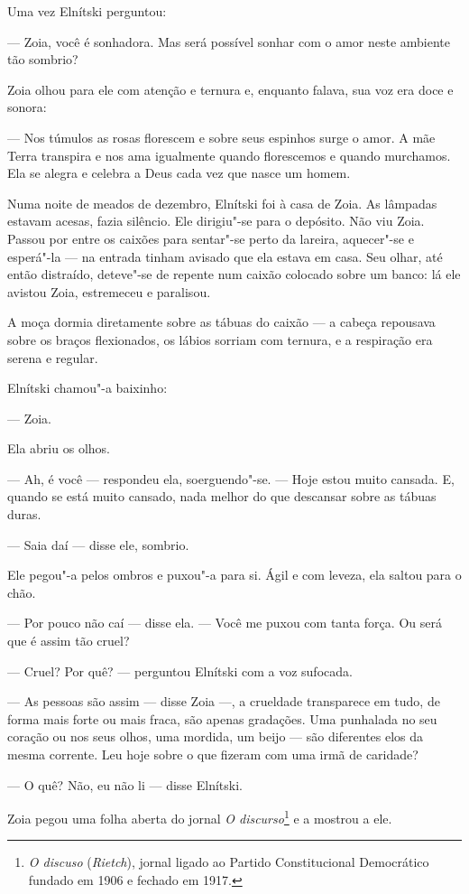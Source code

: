 Uma vez Elnítski perguntou:

--- Zoia, você é sonhadora. Mas será possível sonhar com o amor neste
ambiente tão sombrio?

Zoia olhou para ele com atenção e ternura e, enquanto falava, sua voz
era doce e sonora:

--- Nos túmulos as rosas florescem e sobre seus espinhos surge o amor. A
mãe Terra transpira e nos ama igualmente quando florescemos e quando
murchamos. Ela se alegra e celebra a Deus cada vez que nasce um homem.

Numa noite de meados de dezembro, Elnítski foi à casa de Zoia. As
lâmpadas estavam acesas, fazia silêncio. Ele dirigiu"-se para o depósito.
Não viu Zoia. Passou por entre os caixões para sentar"-se perto da
lareira, aquecer"-se e esperá"-la --- na entrada tinham avisado que ela
estava em casa. Seu olhar, até então distraído, deteve"-se de repente num
caixão colocado sobre um banco: lá ele avistou Zoia, estremeceu e
paralisou.

A moça dormia diretamente sobre as tábuas do caixão --- a cabeça
repousava sobre os braços flexionados, os lábios sorriam com ternura, e
a respiração era serena e regular.

Elnítski chamou"-a baixinho:

--- Zoia.

Ela abriu os olhos.

--- Ah, é você --- respondeu ela, soerguendo"-se. --- Hoje estou muito
cansada. E, quando se está muito cansado, nada melhor do que descansar
sobre as tábuas duras.

--- Saia daí --- disse ele, sombrio.

Ele pegou"-a pelos ombros e puxou"-a para si. Ágil e com leveza, ela
saltou para o chão.

--- Por pouco não caí --- disse ela. --- Você me puxou com tanta força.
Ou será que é assim tão cruel?

--- Cruel? Por quê? --- perguntou Elnítski com a voz sufocada.

--- As pessoas são assim --- disse Zoia ---, a crueldade transparece em
tudo, de forma mais forte ou mais fraca, são apenas gradações. Uma
punhalada no seu coração ou nos seus olhos, uma mordida, um beijo ---
são diferentes elos da mesma corrente. Leu hoje sobre o que fizeram com
uma irmã de caridade?

--- O quê? Não, eu não li --- disse Elnítski.

Zoia pegou uma folha aberta do jornal \emph{O discurso}\footnote{\emph{O
  discuso} (\emph{Rietch}), jornal ligado ao Partido Constitucional
  Democrático fundado em 1906 e fechado em 1917.} e a mostrou a ele.

